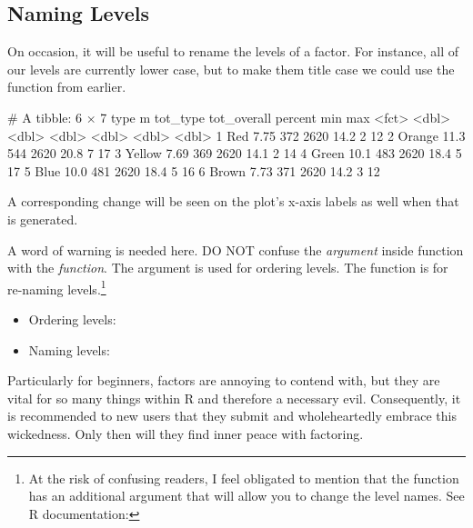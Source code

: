 \subsection{Naming Levels}

On occasion, it will be useful to rename the levels of a factor. For instance, all of our levels are currently lower case, but to make them title case we could use the  function from earlier.

\begin{outR}
# A tibble: 6 × 7
  type       m tot_type tot_overall percent   min   max
  <fct>  <dbl>    <dbl>       <dbl>   <dbl> <dbl> <dbl>
1 Red     7.75      372        2620    14.2     2    12
2 Orange 11.3       544        2620    20.8     7    17
3 Yellow  7.69      369        2620    14.1     2    14
4 Green  10.1       483        2620    18.4     5    17
5 Blue   10.0       481        2620    18.4     5    16
6 Brown   7.73      371        2620    14.2     3    12
\end{outR}

\noindent
A corresponding change will be seen on the plot's x-axis labels as well when that is generated.

A word of warning is needed here. DO NOT confuse the  \textit{argument} inside  function with the  \textit{function}. The  argument is used for ordering levels. The  function is for re-naming levels.\footnote{At the risk of confusing readers, I feel obligated to mention that the  function has an additional argument  that will allow you to change the level names. See R documentation: }

{
\begin{itemize}
    \item Ordering levels: 
    \item Naming levels: 
\end{itemize}
}

Particularly for beginners, factors are annoying to contend with, but they are vital for so many things within R and therefore a necessary evil. Consequently, it is recommended to new users that they submit and wholeheartedly embrace this wickedness. Only then will they find inner peace with factoring.
